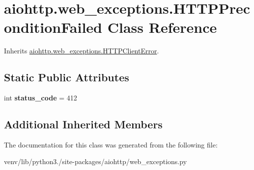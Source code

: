 \hypertarget{classaiohttp_1_1web__exceptions_1_1_h_t_t_p_precondition_failed}{}\section{aiohttp.\+web\+\_\+exceptions.\+H\+T\+T\+P\+Precondition\+Failed Class Reference}
\label{classaiohttp_1_1web__exceptions_1_1_h_t_t_p_precondition_failed}


Inherits \hyperlink{classaiohttp_1_1web__exceptions_1_1_h_t_t_p_client_error}{aiohttp.\+web\+\_\+exceptions.\+H\+T\+T\+P\+Client\+Error}.

\subsection*{Static Public Attributes}
\begin{DoxyCompactItemize}
\item 
\mbox{\label{classaiohttp_1_1web__exceptions_1_1_h_t_t_p_precondition_failed_ac63a9cf06c7be2a4f8d82879fd8150ee}} 
int {\bfseries status\+\_\+code} = 412
\end{DoxyCompactItemize}
\subsection*{Additional Inherited Members}


The documentation for this class was generated from the following file\+:\begin{DoxyCompactItemize}
\item 
venv/lib/python3./site-\/packages/aiohttp/web\+\_\+exceptions.\+py\end{DoxyCompactItemize}
